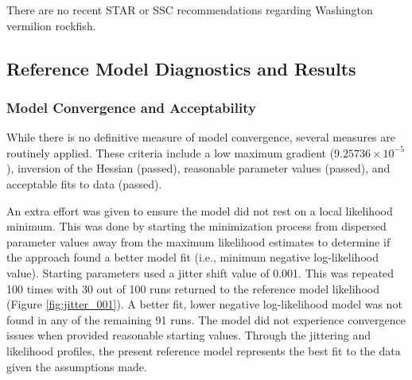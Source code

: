 \documentclass[11pt,
  english,
  a4paper,
]{article}
\begin{document}

There are no recent STAR or SSC recommendations regarding Washington vermilion rockfish.

\leavevmode\tagmcend\tagstructend\par


\hypertarget{reference-model-diagnostics-and-results}{%
\subsection{Reference Model Diagnostics and Results}\label{reference-model-diagnostics-and-results}}

\leavevmode\tagmcend\tagstructend


\hypertarget{model-convergence-and-acceptability}{%
\subsubsection{Model Convergence and Acceptability}\label{model-convergence-and-acceptability}}

\leavevmode\tagmcend\tagstructend


While there is no definitive measure of model convergence, several measures are routinely applied. These criteria include a low maximum gradient (\ensuremath{9.25736\times 10^{-5}}), inversion of the Hessian (passed), reasonable parameter values (passed), and acceptable fits to data (passed).

\leavevmode\tagmcend\tagstructend\par


An extra effort was given to ensure the model did not rest on a local likelihood minimum. This was done by starting the minimization process from dispersed parameter values away from the maximum likelihood estimates to determine if the approach found a better model fit (i.e., minimum negative log-likelihood value). Starting parameters used a jitter shift value of 0.001. This was repeated 100 times with 30 out of 100 runs returned to the reference model likelihood (Figure \ref{fig:jitter_001}). A better fit, lower negative log-likelihood model was not found in any of the remaining 91 runs. The model did not experience convergence issues when provided reasonable starting values. Through the jittering and likelihood profiles, the present reference model represents the best fit to the data given the assumptions made.
\end{document}
